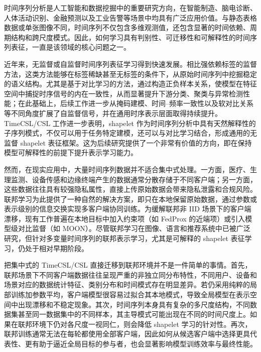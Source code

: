 \documentclass{article}
\begin{document}
时间序列分析是人工智能和数据挖掘中的重要研究方向，在智能制造、脑电诊断、人体活动识别、金融预测以及工业告警等场景中均具有广泛应用价值。与静态表格数据或单张图像不同，时间序列不仅包含多维观测值，还包含显著的时间依赖、周期结构和跨尺度模式。因此，如何学习具有判别性、可迁移性和可解释性的时间序列表征，一直是该领域的核心问题之一。

近年来，无监督或自监督时间序列表征学习得到快速发展。相比强依赖标签的监督方法，这类方法能够在标签稀缺甚至无标签的条件下，从原始时间序列中挖掘稳定的语义结构。尤其是基于对比学习的方法，通过构造正负样本关系，使模型在特征空间中捕捉时序信号的内在一致性，从而显著提升下游分类、聚类与异常检测性能\cite{ts2vec,tstcc,tfc}；在此基础上，后续工作进一步从掩码建模\cite{simmtm}、时间--频率一致性\cite{tfc}以及软对比关系\cite{softclt}等不同角度扩展了自监督信号，并在通用时序表示层面取得持续提升\cite{timesurl}。TimeCSL/CSL 工作进一步表明，shapelet 作为时间序列分析中具有天然解释性的子序列模式，不仅可以用于任务特定建模，还可以与对比学习结合，形成通用的无监督 shapelet 表征框架\cite{timescsl}。这为后续研究提供了一个非常有价值的方向，即在保持模型可解释性的前提下提升表示学习能力\cite{interpgn,unishape}。

然而，在现实应用中，大量时间序列数据并不适合集中式处理。一方面，医疗、生理监测、设备传感和边缘终端产生的数据通常分散存储于不同客户端；另一方面，这些数据往往具有较强隐私属性，直接上传原始数据会带来隐私泄露和合规风险。联邦学习为此提供了一种自然的解决方案，即只在本地保留原始数据，通过参数或表示级别的信息交换实现多客户端协同训练\cite{fedavg}。为缓解联邦非 IID 场景下的客户端漂移，现有工作普遍在本地目标中加入约束项（如 FedProx 的近端项\cite{fedprox}）或引入模型级对比监督（如 MOON\cite{moon}）。尽管联邦学习在图像、语言和推荐系统中已被广泛研究，但针对多变量时间序列的联邦表示学习，尤其是可解释的 shapelet 表征学习，仍处于相对早期阶段\cite{fedst,fedtsc}。

把集中式的 TimeCSL/CSL 直接迁移到联邦环境并不是一件简单的事情。首先，联邦场景下不同客户端数据往往呈现严重的非独立同分布特性，不同用户、设备和场景对应的数据统计特征、类别分布和时间模式存在明显差异。若仍采用纯粹的局部训练加参数平均，客户端模型很容易过拟合其本地模式，导致全局模型在表示空间中出现漂移和不稳定现象。其次，时间序列本身具有复杂的多尺度结构，不同数据集甚至同一数据集中的不同样本，其主导模式可能出现在不同的时间尺度上。如果在联邦环境下仍对各尺度一视同仁，则会降低 shapelet 学习的针对性。再次，联邦训练通常无法在每轮都使用全部客户端，因此如何从候选客户端中选择更具代表性、更有助于逼近全局目标的参与者，也会显著影响模型训练效率与最终性能。
\end{document}
